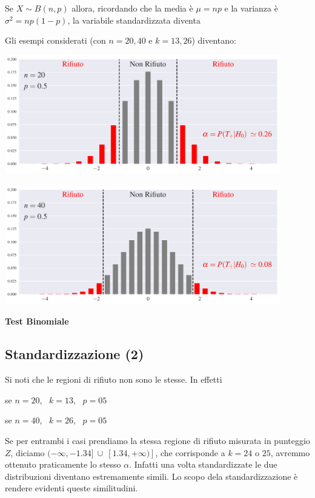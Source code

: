 \documentclass[12pt,openany]{book}
\theoremstyle{mio}
\theoremstyle{liscio}
\begin{document}
Se $X\sim B(n,p)$ allora, ricordando che la media è $\mu=np$ e la varianza è $\sigma^2=np(1-p)$, la variabile standardizzata diventa




Gli esempi considerati (con $n=20,40$ e $k=13,26$) diventano: 

\hfil\includegraphics[width=0.9\textwidth]{figure/B-test-standard_01.pdf}

\hfil\includegraphics[width=0.9\textwidth]{figure/B-test-standard_02.pdf}


\hfill{}\clearpage\hfill\textbf{Test Binomiale}
\subsection{Standardizzazione (2)}

Si noti che le regioni di rifiuto non sono le stesse. In effetti


\qquad se $n=20$, \ $k=13$, \ $p=05$


\qquad se $n=40$, \ $k=26$, \ $p=05$


Se per entrambi i casi prendiamo la stessa regione di rifiuto misurata in punteggio $Z$, diciamo $(-\infty, -1.34]\ \cup\ [1.34, +\infty)]$, che corrisponde a $k=24$ o $25$,  avremmo ottenuto praticamente lo stesso $\alpha$. Infatti una volta standardizzate le due distribuzioni diventano estremamente simili. Lo scopo dela standardizzazione è rendere evidenti queste similitudini.  
\end{document}
